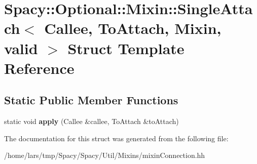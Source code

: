 \hypertarget{structSpacy_1_1Optional_1_1Mixin_1_1SingleAttach}{}\section{Spacy\+:\+:Optional\+:\+:Mixin\+:\+:Single\+Attach$<$ Callee, To\+Attach, Mixin, valid $>$ Struct Template Reference}
\label{structSpacy_1_1Optional_1_1Mixin_1_1SingleAttach}
\subsection*{Static Public Member Functions}
\begin{DoxyCompactItemize}
\item 
static void {\bfseries apply} (Callee \&callee, To\+Attach \&to\+Attach)\hypertarget{structSpacy_1_1Optional_1_1Mixin_1_1SingleAttach_a52061c5546bfd2d59ad15881dda8a01d}{}\label{structSpacy_1_1Optional_1_1Mixin_1_1SingleAttach_a52061c5546bfd2d59ad15881dda8a01d}

\end{DoxyCompactItemize}


The documentation for this struct was generated from the following file\+:\begin{DoxyCompactItemize}
\item 
/home/lars/tmp/\+Spacy/\+Spacy/\+Util/\+Mixins/mixin\+Connection.\+hh\end{DoxyCompactItemize}
